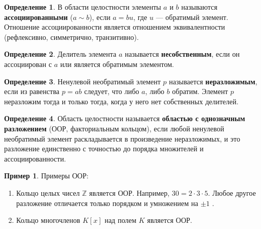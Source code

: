 \documentclass[12pt, a4paper]{article}
\theoremstyle{definition}
\newtheorem{definition}{Определение}[section]
\newtheorem{example}{Пример}[section]
\theoremstyle{plain}
\begin{document}
	\begin{definition}
		В области целостности элементы $a$ и $b$ называются \textbf{ассоциированными} ($a \sim b$), если $a = bu$, где $u$ — обратимый элемент. Отношение ассоциированности является отношением эквивалентности (рефлексивно, симметрично, транзитивно).
	\end{definition}
	
	\begin{definition}
		Делитель элемента $a$ называется \textbf{несобственным}, если он ассоциирован с $a$ или является обратимым элементом.
	\end{definition}
	
	\begin{definition}
		Ненулевой необратимый элемент $p$ называется \textbf{неразложимым}, если из равенства $p=ab$ следует, что либо $a$, либо $b$ обратим. Элемент $p$ неразложим тогда и только тогда, когда у него нет собственных делителей.
	\end{definition}
	
	\begin{definition}
		Область целостности называется \textbf{областью с однозначным разложением} (ООР, факториальным кольцом), если любой ненулевой необратимый элемент раскладывается в произведение неразложимых, и это разложение единственно с точностью до порядка множителей и ассоциированности.
	\end{definition}
	
	\begin{example}Примеры ООР:
		\begin{enumerate}
			\item Кольцо целых чисел $\mathbb{Z}$ является ООР. Например, $30 = 2 \cdot 3 \cdot 5$. Любое другое разложение отличается только порядком и умножением на $\pm 1$ .
			\item Кольцо многочленов $K[x]$ над полем $K$ является ООР.
		\end{enumerate}
	\end{example}
	
\end{document}
